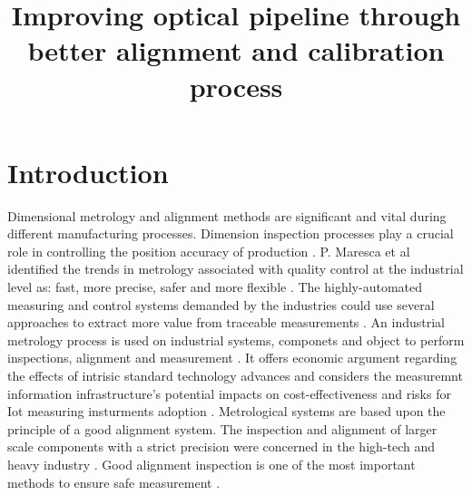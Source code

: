 \documentclass[10pt, a4paper,onecolumn]{article}
\begin{document}
	\title{Improving optical pipeline through better alignment and calibration process}
	\maketitle
	\section{Introduction}
	\label{intro}
	Dimensional metrology and alignment methods are significant and vital during different manufacturing processes. Dimension inspection processes play a crucial role in controlling the position accuracy of production \cite{gu2020study}. P. Maresca et al identified the trends in metrology associated with quality control at the industrial level as: fast, more precise, safer and more flexible \cite{maresca2019evaluation}. The highly-automated measuring and control systems demanded by the industries could use several approaches to extract more value from traceable measurements \cite{hall2019opportunity}. An industrial metrology process is used on industrial systems, componets and object to perform inspections, alignment and measurement \cite{ise2005best}. It offers economic argument regarding the effects of intrisic standard technology advances and considers the measuremnt information infrastructure's potential impacts on cost-effectiveness and risks for Iot measuring insturments adoption \cite{kuster2020measurement}. Metrological systems are based upon the principle of a good alignment system. The inspection and alignment of larger scale components with a strict precision were concerned in the high-tech and heavy industry \cite{gu2020study}. Good alignment inspection is one of the most important methods to ensure safe measurement \cite{peng2020inertial}.
	\newpage
	
	
	
\end{document}

